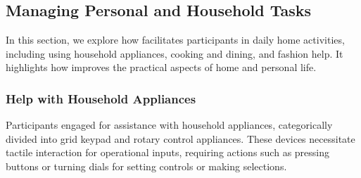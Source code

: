 




\subsection{Managing Personal and Household Tasks}







In this section, we explore how \bma{} facilitates participants in daily home activities, including using household appliances, cooking and dining, and fashion help. It highlights how \bma{} improves the practical aspects of home and personal life.  


\subsubsection{Help with Household Appliances}
\label{appliances}
Participants engaged \bma{} for assistance with household appliances, categorically divided into grid keypad and rotary control appliances. These devices necessitate tactile interaction for operational inputs, requiring actions such as pressing buttons or turning dials for setting controls or making selections. 
% 



